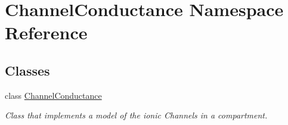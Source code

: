 \hypertarget{namespace_channel_conductance}{\section{Channel\-Conductance Namespace Reference}
\label{namespace_channel_conductance}
}
\subsection*{Classes}
\begin{DoxyCompactItemize}
\item 
class \hyperlink{class_channel_conductance_1_1_channel_conductance}{Channel\-Conductance}
\begin{DoxyCompactList}\small\item\em Class that implements a model of the ionic Channels in a compartment. \end{DoxyCompactList}\end{DoxyCompactItemize}
